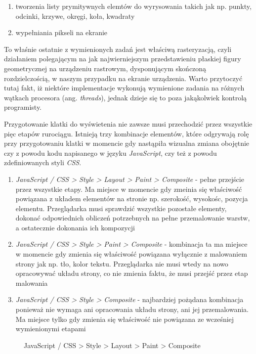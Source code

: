 \documentclass[polish, twoside, 12pt]{mwart}
\begin{document}
\begin{enumerate}
  \item tworzenia listy prymitywnych elemtów do wyrysowania takich jak np. punkty, odcinki, krzywe, okręgi, koła, kwadraty
  \item wypełniania pikseli na ekranie
\end{enumerate}

To właśnie ostatnie z wymienionych zadań jest właściwą rasteryzacją, czyli działaniem polegającym na jak najwierniejszym przedstawieniu płaskiej figury geometrycznej na urządzeniu rastrowym, dysponującym skończoną rozdzielczością, w naszym przypadku na ekranie urządzenia. Warto przytoczyć tutaj fakt, iż niektóre implementacje wykonują wymienione zadania na różnych wątkach procesora (ang. \emph{threads}), jednak dzieje się to poza jakąkolwiek kontrolą programisty.

Przygotowanie klatki do wyświetenia nie zawsze musi przechodzić przez wszystkie pięc etapów rurociągu. Istnieją trzy kombinacje elementów, które odgrywają rolę przy przygotowaniu klatki w momencie gdy nastąpiła wizualna zmiana obojętnie czy z powodu kodu napisanego w języku \emph{JavaScript}, czy też z powodu zdefiniowanych styli \emph{CSS}.

\begin{enumerate}
  \item \emph{JavaScript / CSS > Style > Layout > Paint > Composite} - pełne przejście przez wszystkie etapy. Ma miejsce w momencie gdy zmeinia się właściwość powiązana z układem elementów na stronie np. szerokość, wysokośc, pozycja elementu. Przeglądarka musi sprawdzić wszystkie pozostałe elementy, dokonać odpowiednich obliczeń potrzebnych na pełne przemalowanie warstw, a ostatecznie dokonania ich kompozycji
  \item \emph{JavaScript / CSS > Style > Paint > Composite} - kombinacja ta ma miejsce w momencie gdy zmienia się właściwość powiązana wyłącznie z malowaniem strony jak np. tło, kolor tekstu. Przeglądarka nie musi wtedy na nowo opracowywać układu strony, co nie zmienia faktu, że musi przejść przez etap malowania
  \item \emph{JavaScript / CSS > Style > Composite} - najbardziej pożądana kombinacja ponieważ nie wymaga ani opracowania układu strony, ani jej przemalowania. Ma miejsce tylko gdy zmienia się właściwość nie powiązana ze wcześniej wymienionymi etapami
\end{enumerate}

\begin{figure}[ht]
	\caption{JavaScript / CSS > Style > Layout > Paint > Composite}
\end{figure}
\end{document}
